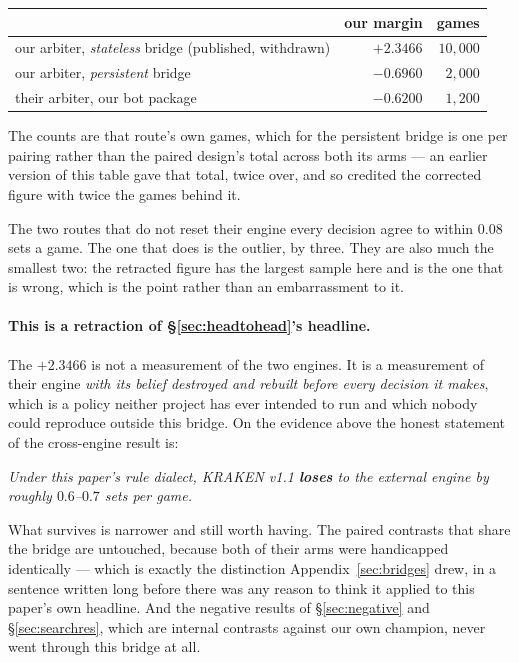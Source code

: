 \documentclass[11pt,letterpaper]{article}
\begin{document}
\begin{center}
\small
\begin{tabular}{lrr}
\toprule
& our margin & games \\
\midrule
our arbiter, \emph{stateless} bridge (published, withdrawn) & $+2.3466$ & $10{,}000$ \\
our arbiter, \emph{persistent} bridge & $-0.6960$ & $2{,}000$ \\
their arbiter, our bot package & $-0.6200$ & $1{,}200$ \\
\bottomrule
\end{tabular}
\end{center}

\noindent The counts are that route's own games, which for the persistent
bridge is one per pairing rather than the paired design's total across both its
arms --- an earlier version of this table gave that total, twice over, and so
credited the corrected figure with twice the games behind it.

The two routes that do not reset their engine every decision agree to within
$0.08$ sets a game. The one that does is the outlier, by three. They are also
much the smallest two: the retracted figure has the largest sample here and is
the one that is wrong, which is the point rather than an embarrassment to it.

\paragraph{This is a retraction of \S\ref{sec:headtohead}'s headline.} The
$+2.3466$ is not a measurement of the two engines. It is a measurement of their
engine \emph{with its belief destroyed and rebuilt before every decision it
makes}, which is a policy neither project has ever intended to run and which
nobody could reproduce outside this bridge. On the evidence above the honest
statement of the cross-engine result is:

\begin{center}
\emph{Under this paper's rule dialect, KRAKEN v1.1 \textbf{loses} to
the external engine by roughly $0.6$--$0.7$ sets per game.}
\end{center}

\noindent What survives is narrower and still worth having. The paired
contrasts that share the bridge are untouched, because both of their arms were
handicapped identically --- which is exactly the distinction
Appendix~\ref{sec:bridges} drew, in a sentence written long before there was any
reason to think it applied to this paper's own headline. And the negative
results of \S\ref{sec:negative} and \S\ref{sec:searchres}, which are internal
contrasts against our own champion, never went through this bridge at all.
\end{document}
